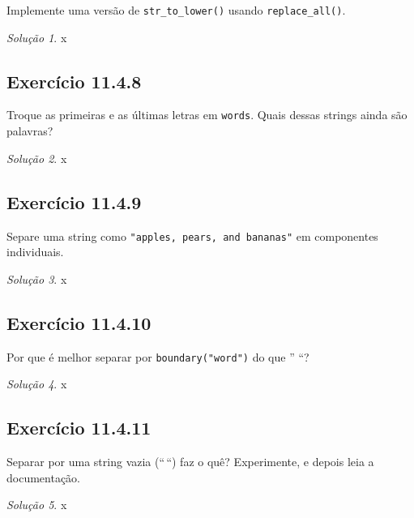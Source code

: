 \documentclass[
]{latex/krantz}
\theoremstyle{definition}
\theoremstyle{definition}
\theoremstyle{definition}
\theoremstyle{definition}
\theoremstyle{remark}
\newtheorem*{solution}{Solução}
\begin{document}
Implemente uma versão de \texttt{str\_to\_lower()} usando \texttt{replace\_all()}.

\begin{solution}
x
\end{solution}

\hypertarget{exr11-4-8}{%
\subsection*{Exercício 11.4.8}\label{exr11-4-8}}

Troque as primeiras e as últimas letras em \texttt{words}. Quais dessas strings ainda são palavras?

\begin{solution}
x
\end{solution}

\hypertarget{exr11-4-9}{%
\subsection*{Exercício 11.4.9}\label{exr11-4-9}}

Separe uma string como \texttt{"apples,\ pears,\ and\ bananas"} em componentes individuais.

\begin{solution}
x
\end{solution}

\hypertarget{exr11-4-10}{%
\subsection*{Exercício 11.4.10}\label{exr11-4-10}}

Por que é melhor separar por \texttt{boundary("word")} do que '' ``?

\begin{solution}
x
\end{solution}

\hypertarget{exr11-4-11}{%
\subsection*{Exercício 11.4.11}\label{exr11-4-11}}

Separar por uma string vazia (``\,``) faz o quê? Experimente, e depois leia a documentação.

\begin{solution}
x
\end{solution}
\end{document}
